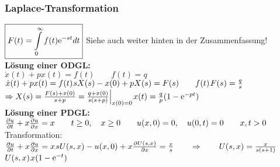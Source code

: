 \subsubsection{Laplace-Transformation}

$\boxed{F(t)=\int\limits_{0}^{\infty}{f(t)\mathrm{e}^{-st}} dt}$ \qquad Siehe auch weiter hinten in der Zusammenfassung!\\

\textbf{Lösung einer ODGL:}\\

$\dot{x}(t)+p x(t)=f(t) \qquad f(t)=q$\\
$\dot{x}(t)+p x(t)=f(t)\FT s X(s)-x(0)+pX(s)=F(s) \qquad f(t)\FT F(s)=\frac{q}{s}$\\

$\Rightarrow X(s)=\frac{F(s)+x(0)}{s+p}=\frac{q+x(0)}{s(s+p)}\Big|_{x(0)=0}\IFT x(t)=\frac{q}{p}(1-\e^{-pt})$\\

\textbf{Lösung einer PDGL:}\\

$\frac{\partial u}{\partial t}+x\frac{\partial u}{\partial x}=x\qquad t\geq 0,\quad x\geq 0\qquad u(x,0)=0,\quad u(0,t)=0\qquad x,t>0$\\

Transformation: $\partFrac{u}{t}+x\partFrac{u}{x}=x\FT sU(s,x)-u(x,0)+x\partFrac{U(s,x)}{x}=\frac{x}{s}\qquad \Rightarrow \qquad U(s,x)=\frac{x}{s(s+1)}$\\
$U(s,x)\IFT x(1-\e^{-t})$











